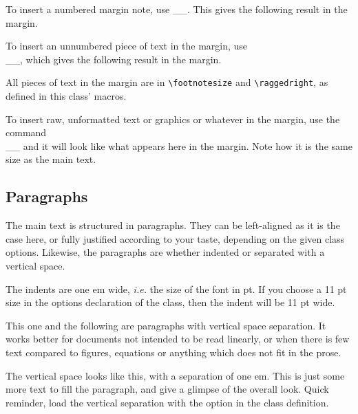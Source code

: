 \documentclass[
	raggedright,
	twoside,
	12pt,
	colorful,
]{tufte-style-article}
\begin{document}
To insert a numbered margin note, use __. This gives the following result in the margin.

To insert an unnumbered piece of text in the margin, use\\\noindent{}__, which gives the following result in the margin.

All pieces of text in the margin are in \texttt{\textbackslash footnotesize} and \texttt{\textbackslash raggedright}, as defined in this class' macros.

To insert raw, unformatted text or graphics or whatever in the margin, use the command\\ __ and it will look like what appears here in the margin. Note how it is the same size as the main text.

\subsection{Paragraphs}

The main text is structured in paragraphs. They can be left-aligned as it is the case here, or fully justified according to your taste, depending on the given class options. Likewise, the paragraphs are whether indented or separated with a vertical space.

The indents are one em wide, \textit{i.e.} the size of the font in pt. If you choose a 11 pt size in the options declaration of the class, then the indent will be 11 pt wide.

\begingroup
\setlength{\parindent}{0em}
\setlength{\parskip}{1em}
This one and the following are paragraphs with vertical space separation. It works better for documents not intended to be read linearly, or when there is few text compared to figures, equations or anything which does not fit in the prose.

The vertical space looks like this, with a separation of one em. This is just some more text to fill the paragraph, and give a glimpse of the overall look. Quick reminder, load the vertical separation with the  option in the class definition.
\endgroup
\end{document}
